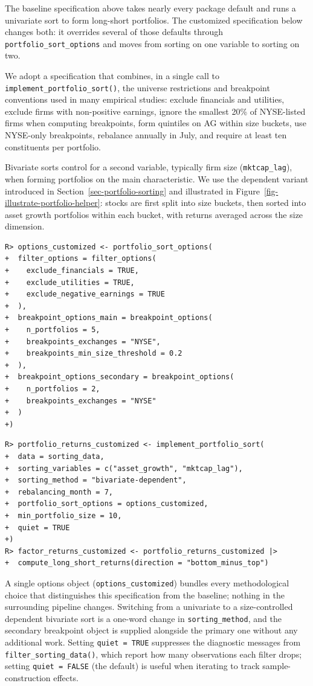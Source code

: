 \documentclass[
  article]{jss}
\begin{document}
The baseline specification above takes nearly every package default and
runs a univariate sort to form long-short portfolios. The customized
specification below changes both: it overrides several of those defaults
through \texttt{portfolio\_sort\_options} and moves from sorting on one
variable to sorting on two.

We adopt a specification that combines, in a single call to
\texttt{implement\_portfolio\_sort()}, the universe restrictions and
breakpoint conventions used in many empirical studies: exclude
financials and utilities, exclude firms with non-positive earnings,
ignore the smallest 20\% of NYSE-listed firms when computing
breakpoints, form quintiles on AG within size buckets, use NYSE-only
breakpoints, rebalance annually in July, and require at least ten
constituents per portfolio.

Bivariate sorts control for a second variable, typically firm size
(\texttt{mktcap\_lag}), when forming portfolios on the main
characteristic. We use the dependent variant introduced in
Section~\ref{sec-portfolio-sorting} and illustrated in
Figure~\ref{fig-illustrate-portfolio-helper}: stocks are first split
into size buckets, then sorted into asset growth portfolios within each
bucket, with returns averaged across the size dimension.

\begin{verbatim}
R> options_customized <- portfolio_sort_options(
+  filter_options = filter_options(
+    exclude_financials = TRUE,
+    exclude_utilities = TRUE,
+    exclude_negative_earnings = TRUE
+  ),
+  breakpoint_options_main = breakpoint_options(
+    n_portfolios = 5,
+    breakpoints_exchanges = "NYSE",
+    breakpoints_min_size_threshold = 0.2
+  ),
+  breakpoint_options_secondary = breakpoint_options(
+    n_portfolios = 2,
+    breakpoints_exchanges = "NYSE"
+  )
+)
\end{verbatim}

\begin{verbatim}
R> portfolio_returns_customized <- implement_portfolio_sort(
+  data = sorting_data,
+  sorting_variables = c("asset_growth", "mktcap_lag"),
+  sorting_method = "bivariate-dependent",
+  rebalancing_month = 7,
+  portfolio_sort_options = options_customized,
+  min_portfolio_size = 10,
+  quiet = TRUE
+)
R> factor_returns_customized <- portfolio_returns_customized |>
+  compute_long_short_returns(direction = "bottom_minus_top")
\end{verbatim}

A single options object (\texttt{options\_customized}) bundles every
methodological choice that distinguishes this specification from the
baseline; nothing in the surrounding pipeline changes. Switching from a
univariate to a size-controlled dependent bivariate sort is a one-word
change in \texttt{sorting\_method}, and the secondary breakpoint object
is supplied alongside the primary one without any additional work.
Setting \texttt{quiet\ =\ TRUE} suppresses the diagnostic messages from
\texttt{filter\_sorting\_data()}, which report how many observations
each filter drops; setting \texttt{quiet\ =\ FALSE} (the default) is
useful when iterating to track sample-construction effects.
\end{document}
